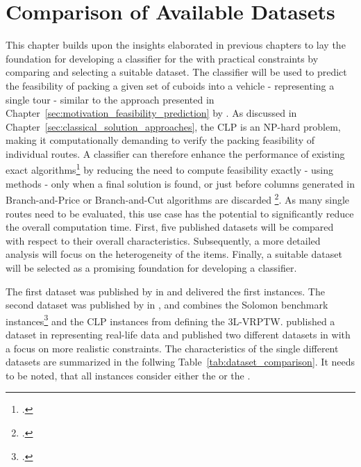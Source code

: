 \chapter{Comparison of Available Datasets}
\label{sec:dataset_selection}

This chapter builds upon the insights elaborated in previous chapters to lay the foundation
for developing a classifier for the  with practical constraints by comparing and
selecting a suitable dataset. The classifier will be used to predict the feasibility of packing a
given set of cuboids into a vehicle - representing a single tour - similar to the approach presented
in Chapter~\ref{sec:motivation_feasibility_prediction} by \citeauthor*{zhang_learning-based_2022}.
As discussed in Chapter~\ref{sec:classical_solution_approaches}, the \gls{CLP} is an NP-hard problem,
making it computationally demanding to verify the packing feasibility of individual routes.
A classifier can therefore enhance the performance of existing exact algorithms\footcite[cf.][]{tamke_branch-and-cut_2024} by reducing the need to compute feasibility exactly - using  methods - only when a final solution is found, or just before columns generated in Branch-and-Price or Branch-and-Cut algorithms are discarded \footcite[cf.][pp. 9--11]{zhang_learning-based_2022}. As many single routes need to be evaluated, this use case has the potential to significantly reduce the overall
computation time. First, five published  datasets will be compared with respect
to their overall characteristics. Subsequently, a more detailed analysis will focus on the
heterogeneity of the items. Finally, a suitable dataset will be selected as a promising foundation
for developing a classifier.

The first  dataset was published by \citeauthor*{gendreau_tabu_2006} in
\citeyear{gendreau_tabu_2006} and delivered the first  instances.
The second dataset was published by \citeauthor*{moura_integrated_2009} in \citeyear{moura_integrated_2009}, and combines the Solomon benchmark instances\footcite[cf.][]{solomon_algorithms_1987} and the \gls{CLP} instances from \citeauthor*{bischoff_issues_1995} defining the \gls{3L-VRPTW}. \citeauthor*{ceschia_local_2013} published a  dataset in \citeyear{ceschia_local_2013} representing real-life data and \citeauthor*{krebs_advanced_2021} published two different datasets in \citeyear{krebs_advanced_2021} with a focus on more realistic constraints. The characteristics of the single different datasets are summarized in the follwing Table~\ref{tab:dataset_comparison}. It needs to be noted, that all instances consider either the  or the .

